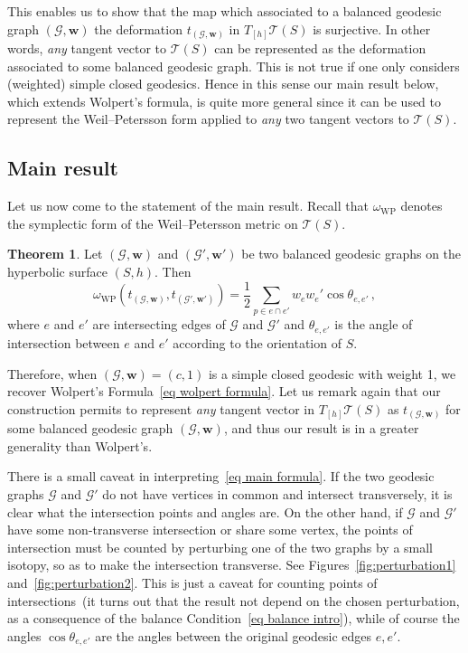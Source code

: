 \documentclass[11pt]{article}
\theoremstyle{definition}
\newtheorem*{theo*}{Theorem}
\numberwithin{equation}{section}
\numberwithin{figure}{section}
\numberwithin{table}{section}
\newcommand{\Teich}{\mathcal{T}}
\newcommand{\weil}{{\mathrm{W}\!\mathrm{P}}}
\begin{document}
This enables us to show that the map which associated to a balanced geodesic graph $(\mathcal G,\mathbf w)$ the deformation $t_{(\mathcal G,\mathbf w)}$ in $T_{[h]}\Teich(S)$ is surjective. In other words, \emph{any} tangent vector to $\Teich(S)$ can be represented as the deformation associated to some balanced geodesic graph. This is not true if one only considers (weighted) simple closed geodesics. Hence in this sense our main result below, which extends Wolpert's formula, is quite more general since it can be used to represent the Weil--Petersson form applied to \emph{any} two tangent vectors to $\Teich(S)$.

\subsection{Main result}

Let us now come to the statement of the main result. Recall that $\omega_\weil$ denotes the symplectic form of the Weil--Petersson metric on $\Teich(S)$.

\begin{theo*}
Let $(\mathcal G,\mathbf w)$ and $(\mathcal G',\mathbf w')$ be two balanced geodesic graphs on the hyperbolic surface $(S,h)$. Then
\begin{equation}\label{eq main formula}
\omega_\weil\left(t_{(\mathcal G,\mathbf w)},t_{(\mathcal G',\mathbf w')}\right)=\frac{1}{2}\sum_{p\in e\cap e'}w_ew_e'\cos \theta_{e,e'}\,,
\end{equation}
where $e$ and $e'$ are intersecting edges of $\mathcal G$ and $\mathcal G'$ and $\theta_{e,e'}$ is the angle of intersection between $e$ and $e'$ according to the orientation of $S$.
\end{theo*}

Therefore, when $(\mathcal G,\mathbf w)=(c,1)$ is a simple closed geodesic with weight 1, we recover Wolpert's Formula~\eqref{eq wolpert formula}. Let us remark again that our construction permits to represent \emph{any} tangent vector in $T_{[h]}\Teich(S)$ as $t_{(\mathcal G,\mathbf w)}$ for some balanced geodesic graph $(\mathcal G,\mathbf w)$, and thus our result is in a greater generality than Wolpert's.

There is a small caveat in interpreting~\eqref{eq main formula}. If the two geodesic graphs $\mathcal G$ and $\mathcal G'$ do not have vertices in common and intersect transversely, it is clear what the intersection points and angles are. On the other hand, if $\mathcal G$ and $\mathcal G'$ have some non-transverse intersection or share some vertex, the points of intersection must be counted by perturbing one of the two graphs by a small isotopy, so as to make the intersection transverse. See Figures~\ref{fig:perturbation1} and~\ref{fig:perturbation2}. This is just a caveat for counting points of intersections~(it turns out that the result not depend on the chosen perturbation, as a consequence of the balance Condition~\eqref{eq balance intro}), while of course the angles $\cos\theta_{e,e'}$ are the angles between the original geodesic edges $e,e'$.
\end{document}
